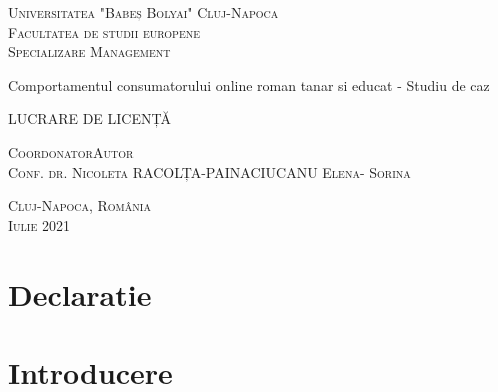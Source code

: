 \documentclass[a4paper, 12pt]{article}
\begin{document}
\begin{titlepage}
	\begin{center}
		\vspace{0.5cm}
		\LARGE \textsc{Universitatea "Babeș Bolyai"}
		\LARGE \textsc{Cluj-Napoca}
		\\
		\vspace{0.5cm}
		\Large \textsc{Facultatea de studii europene}
		\\
		\Large \textsc{Specializare Management}
		
		
		\vspace{1.5cm}
		
		\Huge Comportamentul consumatorului online roman tanar si educat - Studiu de caz
		\\
		\bigskip
	

		\vspace{0.5cm}		
		\Large LUCRARE DE LICENȚĂ
		
		\vfill
		
		\Large
		\textsc{Coordonator}\hfill \textsc{Autor}
		\\
		\large
		\textsc{Conf. dr. Nicoleta RACOLȚA-PAINA}\hfill\textsc{CIUCANU Elena- Sorina}
		
		\vspace{1.5cm}
		\textsc{Cluj-Napoca, România}\\
		\textsc{Iulie 2021}
		
	\end{center}
\end{titlepage}
\restoregeometry

\tableofcontents

\newpage
\listoffigures
\newpage
\listoftables

\newpage
\nocite{bobalcua2015loyal}
\nocite{london_economics_2011}
\nocite{duralia2016particularities}
\nocite{devderea2018consumer}
\nocite{armstrong2014principles}
\nocite{orzan2014study}
\nocite{obradattitudes}
\nocite{sava_2020}
\nocite{bighiu2015compulsive}
\nocite{gorunescu_2020}

\section*{Declaratie}
\newpage

	\section*{Introducere}
	
\end{document}

